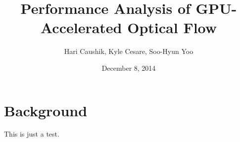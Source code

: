 \documentclass{article}
\title{Performance Analysis of GPU-Accelerated Optical Flow}
\date{December 8, 2014}
\author{Hari Caushik, Kyle Cesare, Soo-Hyun Yoo}
\begin{document}
\maketitle

\newpage

\tableofcontents

\newpage

\section{Background}
This is just a test.
\end{document}
